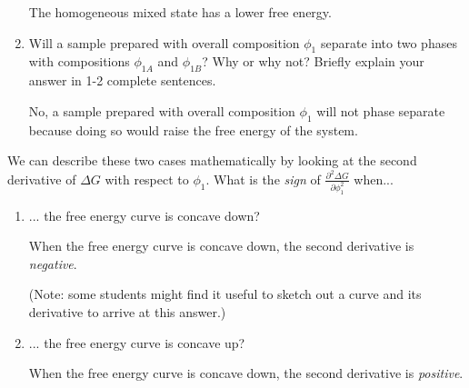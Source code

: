 \begin{activity}
\begin{ctqs}
\begin{enumerate}
\begin{solution}[0.75in]
						The homogeneous mixed state has a lower free energy.
					
					\end{solution}
					
				\item Will a sample prepared with overall composition $\phi_1$ separate into two phases with compositions $\phi_{1A}$ and $\phi_{1B}$?  Why or why not?  Briefly explain your answer in 1-2 complete sentences.
					
					\begin{solution}[2in]
					
						No, a sample prepared with overall composition $\phi_1$ will not phase separate because doing so would raise the free energy of the system.
					
					\end{solution}
					
			\end{enumerate}
			
		\question We can describe these two cases mathematically by looking at the second derivative of $\Delta G$ with respect to $\phi_1$.		
			What is the \emph{sign} of $\frac{\partial^2 \Delta G}{\partial \phi_1^2}$ when...
			
			\begin{enumerate}
				\item ... the free energy curve is concave down?
					
					\begin{solution}[1in]
					
						When the free energy curve is concave down, the second derivative is \emph{negative}.
						
						(Note: some students might find it useful to sketch out a curve and its derivative to arrive at this answer.)
					
					\end{solution}
					
				\item ... the free energy curve is concave up?
					
					\begin{solution}[1in]
					
						When the free energy curve is concave down, the second derivative is \emph{positive}.
						
					\end{solution}
					
			\end{enumerate}
		

\end{ctqs}
\end{activity}
